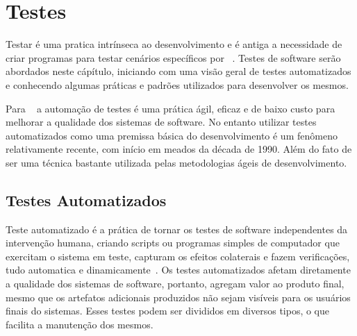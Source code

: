 
\chapter{Testes}
\label{cap:testes}

Testar é uma pratica intrínseca ao desenvolvimento e é antiga a necessidade de
criar programas para testar cenários específicos por ~.
%
Testes de software serão abordados neste cápítulo, iniciando com uma visão geral de testes 
automatizados e conhecendo algumas práticas e padrões utilizados para desenvolver
os mesmos.

Para ~ a automação de testes é uma prática ágil, eficaz e de baixo custo para melhorar
a qualidade dos sistemas de software. No entanto utilizar testes automatizados 
como uma premissa básica do desenvolvimento é um fenômeno relativamente recente, 
com início em meados  da década de 1990. Além do fato de ser uma técnica bastante utilizada pelas metodologias ágeis
de desenvolvimento.


\section{Testes Automatizados}

Teste automatizado é a prática de tornar os testes de software independentes da
intervenção humana, criando scripts ou programas simples de computador que exercitam 
o sistema em teste, capturam os efeitos colaterais e fazem verificações, tudo 
automatica e dinamicamente~\cite{meszaros2007}.
%
Os testes automatizados afetam diretamente a qualidade dos sistemas de software,
portanto, agregam valor  ao produto final, mesmo que os artefatos adicionais
produzidos não sejam visíveis para os usuários finais do sistemas\cite{bernardo2011}.
Esses testes podem ser divididos em diversos tipos, o que facilita a manutenção 
dos mesmos.

